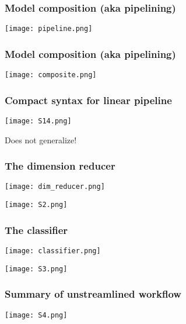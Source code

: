 \documentclass[t]{beamer}
\begin{document}
\begin{frame}
  \frametitle{Model composition (aka pipelining)}
  \vspace{1.5\baselineskip}
    \begin{center}
    \texttt{[image: pipeline.png]}
  \end{center}
\end{frame}

\begin{frame}
  \frametitle{Model composition (aka pipelining)}
  \vspace{1.5\baselineskip}
    \begin{center}
    \texttt{[image: composite.png]}
  \end{center}
\end{frame}

\begin{frame}
  \frametitle{Compact syntax for linear pipeline}
  \vspace{2\baselineskip}
    \texttt{[image: S14.png]}

    \pause Does not generalize!
\end{frame}

\begin{frame}
  \frametitle{The dimension reducer}
    \begin{center}
    \texttt{[image: dim\_reducer.png]}\\
  \end{center}
  \begin{center}
    \texttt{[image: S2.png]}
  \end{center}
\end{frame}

\begin{frame}
  \frametitle{The classifier}
    \begin{center}
    \texttt{[image: classifier.png]}\\
  \end{center}
  \begin{center}
    \texttt{[image: S3.png]}
  \end{center}
\end{frame}

\begin{frame}
  \frametitle{Summary of unstreamlined workflow}
  \vspace{2.5\baselineskip}
    \begin{center}
    \texttt{[image: S4.png]}
  \end{center}
\end{frame}
\end{document}
